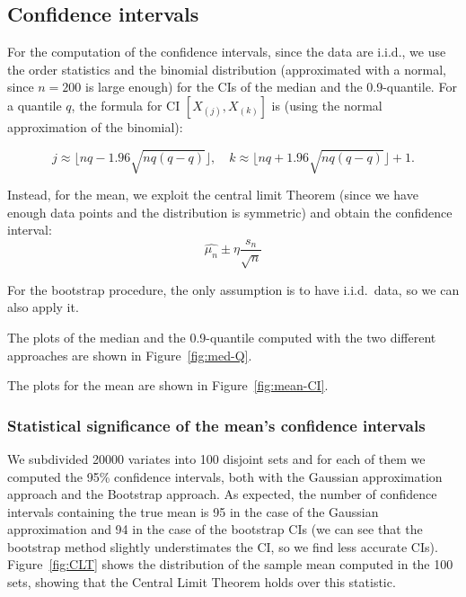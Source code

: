 \documentclass[a4paper,12pt]{article}
\begin{document}
\subsection*{Confidence intervals}
For the computation of the confidence intervals, since the data are i.i.d., we use the order statistics and the binomial distribution (approximated with a normal, since $n=200$ is large enough) for the CIs of the median and the 0.9-quantile.
For a quantile $q$, the formula for CI $[X_{(j)},X_{(k)}]$ is (using the normal approximation of the binomial):

\begin{equation*}
  j \approx \lfloor nq-1.96\sqrt{nq(q-q)} \rfloor, \quad k \approx \lfloor nq+1.96\sqrt{nq(q-q)} \rfloor +1.
\end{equation*}

Instead, for the mean, we exploit the central limit Theorem (since we have enough data points and the distribution is symmetric) and obtain the confidence interval:
\begin{equation*}
  \hat{\mu_n} \pm \eta\frac{s_n}{\sqrt{n}}
\end{equation*}

For the bootstrap procedure, the only assumption is to have i.i.d.\ data, so we can also apply it.

The plots of the median and the 0.9-quantile computed with the two different approaches are shown in Figure~\ref{fig:med-Q}.

The plots for the mean are shown in Figure~\ref{fig:mean-CI}.

\subsubsection*{Statistical significance of the mean's confidence intervals}

We subdivided 20000 variates into 100 disjoint sets and for each of them we computed the 95\% confidence intervals, both with the Gaussian approximation approach and the Bootstrap approach. As expected, the number of confidence intervals containing the true mean is 95 in the case of the Gaussian approximation and 94 in the case of the bootstrap CIs (we can see that the bootstrap method slightly understimates the CI, so we find less accurate CIs). Figure~\ref{fig:CLT} shows the distribution of the sample mean computed in the 100 sets, showing that the Central Limit Theorem holds over this statistic.
\end{document}
